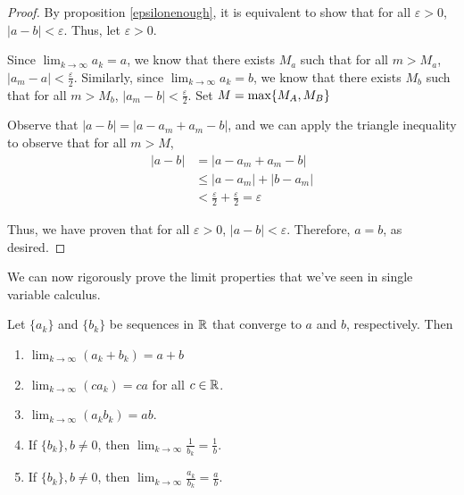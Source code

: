 \begin{proof}
By proposition \ref{epsilonenough}, it is equivalent to show that for all $\varepsilon > 0$, $|a-b| < \varepsilon$.  Thus, let $\varepsilon > 0$.  

Since $\lim_{k \to \infty} a_k = a$, we know that there exists $M_a$ such that for all $m > M_a$, $|a_m -a| < \frac{\varepsilon}{2}$. Similarly, since $\lim_{k\to \infty} a_k = b$, we know that there exists $M_b$ such that for all $m > M_b$, $|a_m -b| < \frac{\varepsilon}{2}$.  Set $M = \textnormal{max}\{M_A, M_B\}$

Observe that $|a-b| = |a - a_m + a_m - b|$, and we can apply the triangle inequality to observe that for all $m > M$,
\begin{align*}
    |a-b| &= |a - a_m + a_m - b| \\
    & \leq |a-a_m| + |b-a_m| \\
    &< \frac{\varepsilon}{2} + \frac{\varepsilon}{2} = \varepsilon
\end{align*}

Thus, we have proven that for all $\varepsilon > 0$, $|a-b| < \varepsilon$.  Therefore, $a = b$, as desired.

\end{proof}


We can now rigorously prove the limit properties that we've seen in single variable calculus.


\begin{theorem}
    Let $\{a_k\}$ and $\{b_k\}$ be sequences in $\mathbb{R}$ that converge to $a$ and $b$, respectively. Then
    
    \begin{enumerate}
        \item $\lim_{k \to \infty}(a_k + b_k) = a + b$
        \item $\lim_{k \to \infty}\left(ca_k\right) = ca$ for all $c \in \mathbb{R}$.
        \item $\lim_{k \to \infty}\left(a_kb_k\right) = ab$.
        \item If $\{b_k\}, b \neq 0$, then $\lim_{k \to \infty}\frac{1}{b_k} = \frac{1}{b}$.
        \item If $\{b_k\}, b \neq 0$, then $\lim_{k \to \infty}\frac{a_k}{b_k} = \frac{a}{b}$.
    \end{enumerate}
    
    
    \end{theorem}
    
    
    
